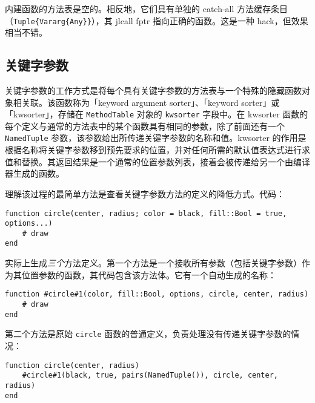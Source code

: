内建函数的方法表是空的。相反地，它们具有单独的 catch-all 方法缓存条目（\texttt{Tuple\{Vararg\{Any\}\}}），其 jlcall fptr 指向正确的函数。这是一种 hack，但效果相当不错。



\hypertarget{8084690442149965313}{}


\subsection{关键字参数}



关键字参数的工作方式是将每个具有关键字参数的方法表与一个特殊的隐藏函数对象相关联。该函数称为「keyword argument sorter」、「keyword sorter」或「kwsorter」，存储在 \texttt{MethodTable} 对象的 \texttt{kwsorter} 字段中。在 kwsorter 函数的每个定义与通常的方法表中的某个函数具有相同的参数，除了前面还有一个 \texttt{NamedTuple} 参数，该参数给出所传递关键字参数的名称和值。kwsorter 的作用是根据名称将关键字参数移到预先要求的位置，并对任何所需的默认值表达式进行求值和替换。其返回结果是一个通常的位置参数列表，接着会被传递给另一个由编译器生成的函数。



理解该过程的最简单方法是查看关键字参数方法的定义的降低方式。代码：




\begin{verbatim}
function circle(center, radius; color = black, fill::Bool = true, options...)
    # draw
end
\end{verbatim}



实际上生成\emph{三个}方法定义。第一个方法是一个接收所有参数（包括关键字参数）作为其位置参数的函数，其代码包含该方法体。它有一个自动生成的名称：




\begin{verbatim}
function #circle#1(color, fill::Bool, options, circle, center, radius)
    # draw
end
\end{verbatim}



第二个方法是原始 \texttt{circle} 函数的普通定义，负责处理没有传递关键字参数的情况：




\begin{verbatim}
function circle(center, radius)
    #circle#1(black, true, pairs(NamedTuple()), circle, center, radius)
end
\end{verbatim}



